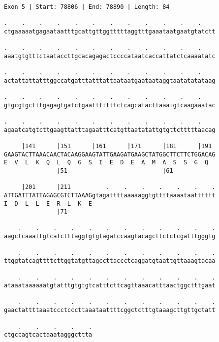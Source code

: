 \documentclass{article}
\begin{document}
\newpage
\begin{Verbatim}[fontfamily=courier]
Exon 5 | Start: 78806 | End: 78890 | Length: 84

.    .    .    .    .    .    .    .    .    .    .    .    
ctgaaaaatgagaataatttgcattgttggtttttaggtttgaaataatgaatgtatctt

.    .    .    .    .    .    .    .    .    .    .    .    
aaatgtgtttctaataccttgcacagagactccccataatcaccattatctcaaaatatc

.    .    .    .    .    .    .    .    .    .    .    .    
actattattatttggccatgatttatttattaataatgaataataggtaatatatataag

.    .    .    .    .    .    .    .    .    .    .    .    
gtgcgtgctttgagagtgatctgaatttttttctcagcatacttaaatgtcaagaaatac

.    .    .    .    .    .    .    .    .    .    .    .    
agaatcatgtcttgaagttatttagaatttcatgttaatatattgtgttctttttaacag

     |141      |151      |161      |171      |181      |191 
GAAGTACTTAAACAACTACAAGGAAGTATTGAAGATGAAGCTATGGCTTCTTCTGGACAG
E  V  L  K  Q  L  Q  G  S  I  E  D  E  A  M  A  S  S  G  Q  
               |51                           |61            

     |201      |211          .    .    .    .    .    .    .
ATTGATTTATTAGAGCGTCTTAAAGgtagattttaaaaaggtgttttaaaataatttttt
I  D  L  L  E  R  L  K  E                                   
               |71                                          

    .    .    .    .    .    .    .    .    .    .    .    .
aagctcaaattgtcatctttaggtgtgtagatccaagtacagcttctctcgatttgggtg

    .    .    .    .    .    .    .    .    .    .    .    .
ttggtatcagttttcttggtatgttagccttaccctcaggatgtaattgttaaagtacaa

    .    .    .    .    .    .    .    .    .    .    .    .
ataaataaaaaatgtatttgtgtgtcatttcttcagttaaacatttaactggctttgaat

    .    .    .    .    .    .    .    .    .    .    .    .
gaactattttaaatccctcccttaaataattttcggctctttgtaaagcttgttgctatt

    .    .    .    .    .
ctgccagtcactaaatagggcttta
\end{Verbatim}
\newpage
\end{document}
